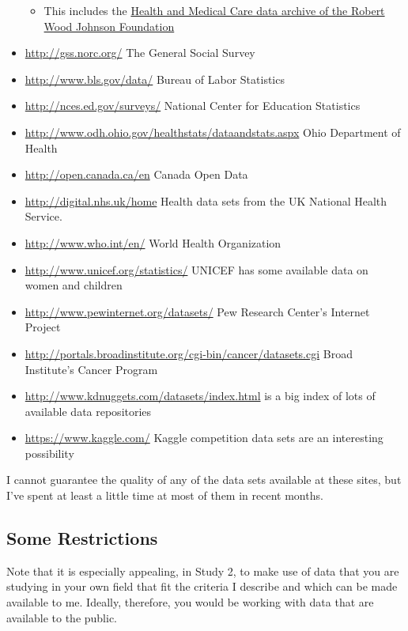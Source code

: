 \documentclass[]{book}
\providecommand{\tightlist}{%
  \setlength{\itemsep}{0pt}\setlength{\parskip}{0pt}}
\theoremstyle{definition}
\theoremstyle{definition}
\theoremstyle{definition}
\theoremstyle{remark}
\begin{document}
\begin{itemize}
  \begin{itemize}
  \tightlist
  \item
    This includes the
    \href{http://www.icpsr.umich.edu/icpsrweb/HMCA/}{Health and Medical
    Care data archive of the Robert Wood Johnson Foundation}
  \end{itemize}
\item
  \url{http://gss.norc.org/} The General Social Survey
\item
  \url{http://www.bls.gov/data/} Bureau of Labor Statistics
\item
  \url{http://nces.ed.gov/surveys/} National Center for Education
  Statistics
\item
  \url{http://www.odh.ohio.gov/healthstats/dataandstats.aspx} Ohio
  Department of Health
\item
  \url{http://open.canada.ca/en} Canada Open Data
\item
  \url{http://digital.nhs.uk/home} Health data sets from the UK National
  Health Service.
\item
  \url{http://www.who.int/en/} World Health Organization
\item
  \url{http://www.unicef.org/statistics/} UNICEF has some available data
  on women and children
\item
  \url{http://www.pewinternet.org/datasets/} Pew Research Center's
  Internet Project
\item
  \url{http://portals.broadinstitute.org/cgi-bin/cancer/datasets.cgi}
  Broad Institute's Cancer Program
\item
  \url{http://www.kdnuggets.com/datasets/index.html} is a big index of
  lots of available data repositories
\item
  \url{https://www.kaggle.com/} Kaggle competition data sets are an
  interesting possibility
\end{itemize}

I cannot guarantee the quality of any of the data sets available at
these sites, but I've spent at least a little time at most of them in
recent months.

\hypertarget{some-restrictions}{%
\subsection{Some Restrictions}\label{some-restrictions}}

Note that it is especially appealing, in Study 2, to make use of data
that you are studying in your own field that fit the criteria I describe
and which can be made available to me. Ideally, therefore, you would be
working with data that are available to the public.
\end{document}
